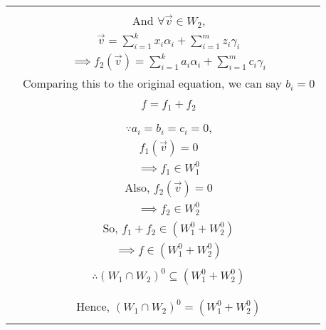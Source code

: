 \documentclass[journal,12pt,twocolumn]{IEEEtran}
\begin{document}
\begin{table}[h!]
\begin{center}
\begin{tabular}{|c|c|}
& \\
& And $\forall \vec{v} \in W_2$,\\
& $\vec{v} = \sum_{i=1}^{k} x_i\alpha_i + \sum_{i=1}^{m} z_i\gamma_i$\\
& $\implies f_2(\vec{v}) = \sum_{i=1}^{k} a_i\alpha_i + \sum_{i=1}^{m} c_i\gamma_i$\\
& Comparing this to the original equation, we can say $b_i = 0$\\
& \\
& $f = f_1 + f_2$\\
& \\
& $\because a_i = b_i = c_i = 0$,\\
& $f_1(\vec{v}) = 0$\\
& $\implies f_1 \in W_1^0$\\
& Also, $f_2(\vec{v}) = 0$\\
& $\implies f_2 \in W_2^0$\\
& So, $f_1 + f_2 \in (W_1^0 + W_2^0)$\\
& $\implies f \in (W_1^0 + W_2^0)$\\
& \\
& $\therefore (W_1 \cap W_2)^0 \subseteq (W_1^0 + W_2^0)$\\
& \\
\hline
& \\
& Hence, $(W_1 \cap W_2)^0 = (W_1^0 + W_2^0)$\\
& \\
\hline
\end{tabular}
\end{center}
\end{table}
\end{document}
